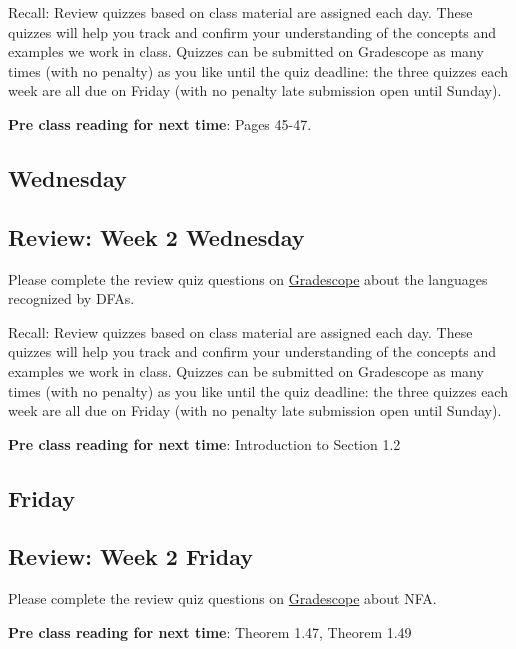 Recall: Review quizzes based on class material are assigned each day. 
These quizzes will help you track and confirm your understanding of the concepts and examples 
we work in class. Quizzes can be submitted on Gradescope as many times (with no penalty) as 
you like until the quiz deadline: the three quizzes each week are all due on Friday (with no penalty 
late submission open until Sunday).

{\bf Pre class reading for next time}: Pages 45-47.


\newpage
\subsection*{Wednesday}



\newpage
\subsection*{Review: Week 2 Wednesday}

Please complete the review quiz questions on \href{http://gradescope.com}{Gradescope} about 
the languages recognized by DFAs.


Recall: Review quizzes based on class material are assigned each day. 
These quizzes will help you track and confirm your understanding of the concepts and examples 
we work in class. Quizzes can be submitted on Gradescope as many times (with no penalty) as 
you like until the quiz deadline: the three quizzes each week are all due on Friday (with no penalty 
late submission open until Sunday).


{\bf Pre class reading for next time}: Introduction to Section 1.2

\newpage
\subsection*{Friday}




\newpage

\subsection*{Review: Week 2 Friday}


Please complete the review quiz questions on \href{http://gradescope.com}{Gradescope} about 
NFA.

{\bf Pre class reading for next time}: Theorem 1.47, Theorem 1.49

